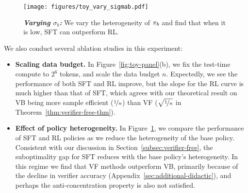 \begin{wrapfigure}{r}{0.35\textwidth}
\vspace{-0.2cm}
  \begin{center}
    \texttt{[image: figures/toy\_vary\_sigmab.pdf]}
  \end{center}
  \vspace{-0.4cm}
  \caption{\footnotesize \textbf{\emph{Varying $\sigma_b$:}} We vary the heterogeneity of $\pi_b$ and find that when it is low, SFT can outperform RL. \vspace{-0.2cm}}
    \label{fig:toy-vary-sigma-b}
\end{wrapfigure}
We also conduct several ablation studies in this experiment:
\begin{itemize}[topsep=-2pt,itemsep=4pt]
    \item \textbf{Scaling data budget.} In Figure~\ref{fig:toy-panel}(b), we fix the test-time compute to $2^6$ tokens, and scale the data budget $n$. Expectedly, we see the performance of both SFT and RL improve, but the slope for the RL curve is much higher than that of SFT, which agrees with our theoretical result on VB being more sample efficient ($\nicefrac{1}{n}$) than VF ($\sqrt{\nicefrac{1}{n}}$ in Theorem~\ref{thm:verifier-free-thm}).
    \item \textbf{Effect of policy heterogeneity.} In Figure~\ref{fig:toy-vary-sigma-b}, we compare the performance of SFT and RL policies as we reduce the heterogeneity of the base policy. Consistent with our discussion in Section~\ref{subsec:verifier-free}, the suboptimality gap for SFT reduces with the base policy's heterogeneity. In this regime we find that VF methods outperform VB, primarily because of the decline in verifier accuracy (Appendix~\ref{sec:additional-didactic}), and perhaps the anti-concentration property is also not satisfied. 
\end{itemize}























